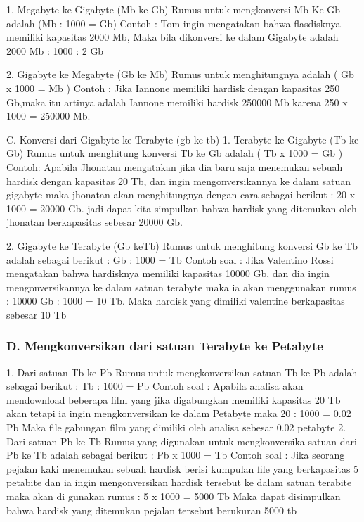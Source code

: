 1.	Megabyte ke Gigabyte (Mb ke Gb)
Rumus untuk mengkonversi Mb Ke Gb adalah (Mb : 1000 = Gb)
Contoh :
Tom ingin mengatakan bahwa flasdisknya memiliki kapasitas 2000 Mb, Maka bila dikonversi ke dalam Gigabyte adalah 2000 Mb : 1000 : 2 Gb

2.	Gigabyte ke Megabyte (Gb ke Mb)
Rumus untuk menghitungnya adalah ( Gb x 1000 = Mb )
Contoh :
Jika Iannone memiliki hardisk dengan kapasitas 250 Gb,maka itu artinya adalah Iannone memiliki hardisk 250000 Mb karena 250 x 1000 = 250000 Mb.

C. Konversi dari Gigabyte ke Terabyte (gb ke tb)
1. Terabyte ke Gigabyte (Tb ke Gb)
Rumus untuk menghitung konversi Tb ke Gb adalah ( Tb x 1000 = Gb )
Contoh:
Apabila Jhonatan mengatakan jika dia baru saja menemukan sebuah hardisk dengan kapasitas 20 Tb, dan ingin mengonversikannya ke dalam satuan gigabyte maka jhonatan akan menghitungnya dengan cara sebagai berikut :
20 x 1000 = 20000 Gb.
jadi dapat kita simpulkan bahwa  hardisk yang ditemukan oleh jhonatan berkapasitas sebesar 20000 Gb.

2.	Gigabyte ke Terabyte (Gb keTb)
Rumus untuk menghitung konversi Gb ke Tb  adalah sebagai berikut :
 Gb : 1000 = Tb
Contoh soal :
Jika Valentino Rossi mengatakan bahwa hardisknya memiliki kapasitas 10000 Gb, dan dia ingin mengonversikannya ke dalam satuan terabyte maka ia akan menggunakan rumus :
10000 Gb : 1000 = 10 Tb.
Maka hardisk yang dimiliki valentine berkapasitas sebesar 10 Tb

\subsubsection {D. Mengkonversikan dari satuan Terabyte ke Petabyte}

1.	Dari satuan Tb ke Pb
Rumus untuk mengkonversikan satuan Tb ke Pb adalah sebagai berikut :
Tb : 1000 = Pb
Contoh soal :
Apabila analisa akan mendownload beberapa film yang jika digabungkan memiliki kapasitas 20 Tb akan tetapi ia ingin mengkonversikan ke dalam Petabyte maka 
20 : 1000 = 0.02 Pb
Maka file gabungan film yang dimiliki oleh analisa sebesar 0.02 petabyte
2. Dari satuan Pb ke Tb
Rumus yang digunakan untuk mengkonversika satuan dari Pb ke Tb adalah sebagai berikut :
Pb x 1000 = Tb
Contoh soal :
Jika seorang pejalan kaki menemukan sebuah hardisk berisi kumpulan file yang berkapasitas 5 petabite dan ia ingin mengonversikan hardisk tersebut ke dalam satuan terabite maka akan di gunakan rumus :
5 x 1000 = 5000 Tb
Maka dapat disimpulkan bahwa hardisk yang ditemukan pejalan tersebut berukuran 5000 tb

